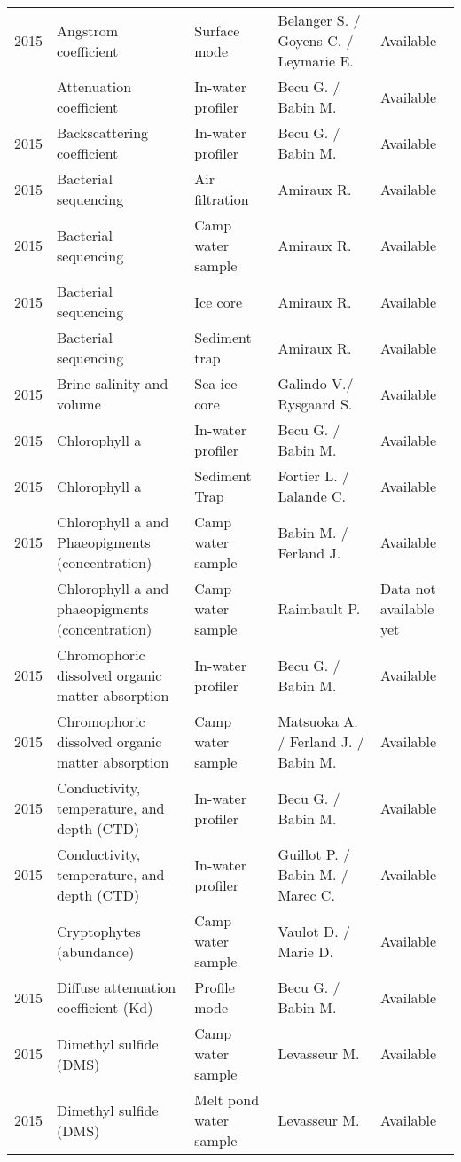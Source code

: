 \documentclass[]{article}
\begin{document}
\begin{landscape}
\begin{longtable}{rllll}
2015 & Angstrom coefficient & Surface mode & Belanger S. / Goyens C. / Leymarie E. & Available\\
\addlinespace
2015 & Attenuation coefficient & In-water profiler & Becu G. / Babin M. & Available\\
2015 & Backscattering coefficient & In-water profiler & Becu G. / Babin M. & Available\\
2015 & Bacterial sequencing & Air filtration & Amiraux R. & Available\\
2015 & Bacterial sequencing & Camp water sample & Amiraux R. & Available\\
2015 & Bacterial sequencing & Ice core & Amiraux R. & Available\\
\addlinespace
2015 & Bacterial sequencing & Sediment trap & Amiraux R. & Available\\
2015 & Brine salinity and volume & Sea ice core & Galindo V./ Rysgaard S. & Available\\
2015 & Chlorophyll a & In-water profiler & Becu G. / Babin M. & Available\\
2015 & Chlorophyll a & Sediment Trap & Fortier L. / Lalande C. & Available\\
2015 & Chlorophyll a and Phaeopigments (concentration) & Camp water sample & Babin M. / Ferland J. & Available\\
\addlinespace
2015 & Chlorophyll a and phaeopigments (concentration) & Camp water sample & Raimbault P. & Data not available yet\\
2015 & Chromophoric dissolved organic matter absorption & In-water profiler & Becu G. / Babin M. & Available\\
2015 & Chromophoric dissolved organic matter absorption & Camp water sample & Matsuoka A. / Ferland J. / Babin M. & Available\\
2015 & Conductivity, temperature, and depth (CTD) & In-water profiler & Becu G. / Babin M. & Available\\
2015 & Conductivity, temperature, and depth (CTD) & In-water profiler & Guillot P. / Babin M. / Marec C. & Available\\
\addlinespace
2015 & Cryptophytes (abundance) & Camp water sample & Vaulot D. / Marie D. & Available\\
2015 & Diffuse attenuation coefficient (Kd) & Profile mode & Becu G. / Babin M. & Available\\
2015 & Dimethyl sulfide (DMS) & Camp water sample & Levasseur M. & Available\\
2015 & Dimethyl sulfide (DMS) & Melt pond water sample & Levasseur M. & Available\\

\end{longtable}
\end{landscape}
\end{document}
